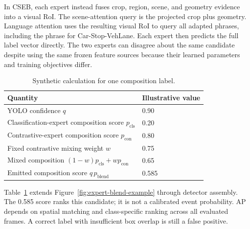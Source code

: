 In CSEB, each expert instead fuses crop, region, scene, and geometry evidence into a visual RoI. The scene-attention query is the projected crop plus geometry. Language attention uses the resulting visual RoI to query all adapted phrases, including the phrase for Car-Stop-VehLane. Each expert then predicts the full label vector directly. The two experts can disagree about the same candidate despite using the same frozen feature sources because their learned parameters and training objectives differ.

\begin{table}[htbp]
\centering
\caption{Synthetic calculation for one composition label.}
\label{tab:worked-score}
\begin{singlespace}
\begin{tabularx}{\textwidth}{@{}Xl@{}}
\toprule
\textbf{Quantity} & \textbf{Illustrative value}\\
\midrule
YOLO confidence \(q\) & 0.90\\
Classification-expert composition score \(p_{\mathrm{cls}}\) & 0.20\\
Contrastive-expert composition score \(p_{\mathrm{con}}\) & 0.80\\
Fixed contrastive mixing weight \(w\) & 0.75\\
Mixed composition \((1-w)p_{\mathrm{cls}}+wp_{\mathrm{con}}\) & 0.65\\
Emitted composition score \(q\,p_{\mathrm{blend}}\) & 0.585\\
\bottomrule
\end{tabularx}
\end{singlespace}
\end{table}

Table~\ref{tab:worked-score} extends Figure~\ref{fig:expert-blend-example} through detector assembly. The 0.585 score ranks this candidate; it is not a calibrated event probability. AP depends on spatial matching and class-specific ranking across all evaluated frames. A correct label with insufficient box overlap is still a false positive.
